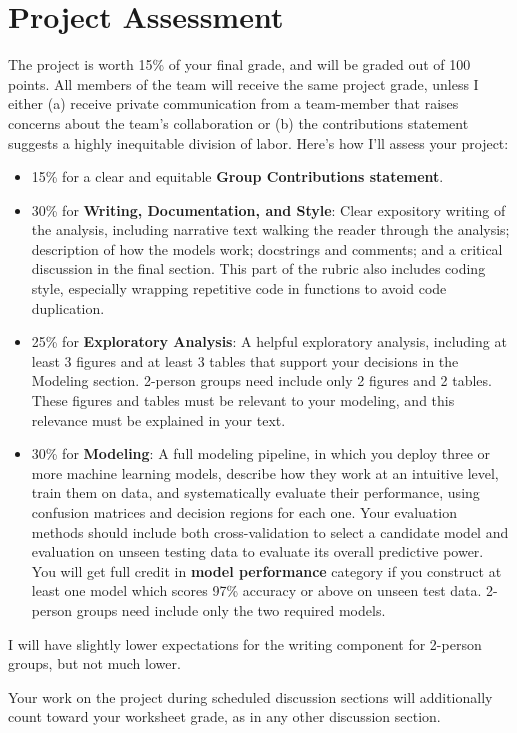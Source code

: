 \documentclass[12pt]{article}
\begin{document}
\section{Project Assessment}
The project is worth 15\% of your final grade, and will be graded out of 100 points. All members of the team will receive the same project grade, unless I either (a) receive private communication from a team-member that raises concerns about the team’s collaboration or (b) the contributions statement suggests a highly inequitable division of labor.
Here’s how I’ll assess your project:
\begin{itemize}
\item 15\% for a clear and equitable {\bf Group Contributions statement}.
\item 30\% for {\bf Writing, Documentation, and Style}: Clear expository writing of the analysis, including narrative text walking the reader through the analysis; description of how the models work; docstrings and comments; and a critical discussion in the final section. This part of the rubric also includes coding style, especially wrapping repetitive code in functions to avoid code duplication.
\item 25\% for {\bf Exploratory Analysis}: A helpful exploratory analysis, including at least 3 figures and at least 3 tables that support your decisions in the Modeling section. 2-person groups need include only 2 figures and 2 tables. These figures and tables must be relevant to your modeling, and this relevance must be explained in your text.
\item 30\% for {\bf Modeling}: A full modeling pipeline, in which you deploy three or more machine learning models, describe how they work at an intuitive level, train them on data, and systematically evaluate their performance, using confusion matrices and decision regions for each one. Your evaluation methods should include both cross-validation to select a candidate model and evaluation on unseen testing data to evaluate its overall predictive power. You will get full credit in {\bf model performance} category if you construct at least one model which scores 97\% accuracy or above on unseen test data. 2-person groups need include only the two required models.
\end{itemize}
I will have slightly lower expectations for the writing component for 2-person groups, but not much lower.

\noindent Your work on the project during scheduled discussion sections will additionally count toward your worksheet grade, as in any other discussion section.
\end{document}
